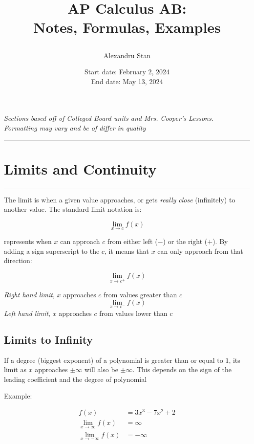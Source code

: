 \documentclass[12pt]{article}
\title{
    \textbf{AP Calculus AB:\\ Notes, Formulas, Examples}
    \author{Alexandru Stan}
    \date{Start date: February 2, 2024 \\ End date: May 13, 2024}
}
\newcommand{\fline}{\par\noindent\rule{\textwidth}{0.1pt}}
\newcommand{\uit}[1]{\textit{#1}}
\begin{document}
    \maketitle
    \vfill
    \begin{center}
        \uit{
            Sections based off of Colleged Board units and Mrs. Cooper's Lessons. \\
            Formatting may vary and be of differ in quality
        }
    \end{center}
    \newpage

    \tableofcontents
    \fline
    \newpage

    \section{Limits and Continuity}
    \fline

    The limit is when a given value approaches, or gets \textit{really close} (infinitely) to another value. 
    The standard limit notation is:

    \[
        \lim_{x \to c} f(x)    
    \]

    represents when $x$ can approach $c$ from either left ($-$) or the right ($+$). By adding
    a sign superscript to the $c$, it means that $x$ can only approach from that direction:

    \[
        \lim_{x \to c^+} f(x)    
    \]

    \begin{center}
        \uit{Right hand limit}, $x$ approaches $c$ from values greater than $c$
        \[
            \lim_{x \to c^-} f(x)    
        \]
        \uit{Left hand limit}, $x$ approaches $c$ from values lower than $c$
    \end{center}

    \subsection{Limits to Infinity}

    If a degree (biggest exponent) of a polynomial is greater than or equal to $1$, its
    limit as $x$ approaches $\pm\infty$ will also be $\pm\infty$. This depends on the sign of the leading
    coefficient and the degree of polynomial

    \noindent Example:

    \[
        \begin{aligned}
            f(x) &= 3x^3 - 7x^2 + 2 \\
            \lim_{x \to \infty} f(x) &= \infty \\
            \lim_{x \to -\infty} f(x) &= -\infty     
        \end{aligned}    
    \]
\end{document}
